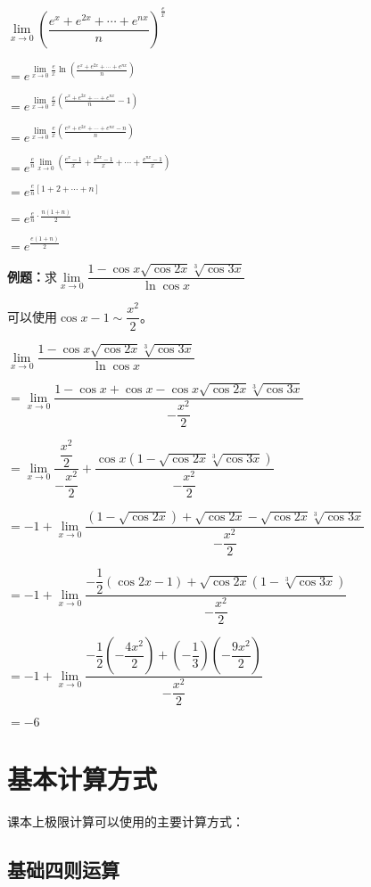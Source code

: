 \documentclass[UTF8, 12pt]{ctexart}
\begin{document}
$\lim\limits_{x\to 0}\left(\dfrac{e^x+e^{2x}+\cdots+e^{nx}}{n}\right)^{\frac{e}{x}}$

$=e^{\lim\limits_{x\to 0}\frac{e}{x}\ln\left(\frac{e^x+e^{2x}+\cdots+e^{nx}}{n}\right)}$

$=e^{\lim\limits_{x\to 0}\frac{e}{x}\left(\frac{e^x+e^{2x}+\cdots+e^{nx}}{n}-1\right)}$

$=e^{\lim\limits_{x\to 0}\frac{e}{x}\left(\frac{e^x+e^{2x}+\cdots+e^{nx}-n}{n}\right)}$

$=e^{\frac{e}{n}\lim\limits_{x\to 0}\left(\frac{e^x-1}{x}+\frac{e^{2x}-1}{x}+\cdots+\frac{e^{nx}-1}{x}\right)}$

$=e^{\frac{e}{n}[1+2+\cdots+n]}$

$=e^{\frac{e}{n}\cdot\frac{n(1+n)}{2}}$

$=e^{\frac{e(1+n)}{2}}$

\textbf{例题：}求$\lim\limits_{x\to 0}\dfrac{1-\cos x\sqrt{\cos 2x}\sqrt[3]{\cos 3x}}{\ln\cos x}$\medskip

可以使用$\cos x-1\sim\dfrac{x^2}{2}$。\medskip

$\lim\limits_{x\to 0}\dfrac{1-\cos x\sqrt{\cos 2x}\sqrt[3]{\cos 3x}}{\ln\cos x}$

$=\lim\limits_{x\to 0}\dfrac{1-\cos x+\cos x-\cos x\sqrt{\cos 2x}\sqrt[3]{\cos 3x}}{-\dfrac{x^2}{2}}$

$=\lim\limits_{x\to 0}\dfrac{\dfrac{x^2}{2}}{-\dfrac{x^2}{2}}+\dfrac{\cos x(1-\sqrt{\cos 2x}\sqrt[3]{\cos 3x})}{-\dfrac{x^2}{2}}$

$=-1+\lim\limits_{x\to 0}\dfrac{(1-\sqrt{\cos 2x})+\sqrt{\cos 2x}-\sqrt{\cos 2x}\sqrt[3]{\cos 3x}}{-\dfrac{x^2}{2}}$

$=-1+\lim\limits_{x\to 0}\dfrac{-\dfrac{1}{2}(\cos 2x-1)+\sqrt{\cos 2x}(1-\sqrt[3]{\cos 3x})}{-\dfrac{x^2}{2}}$

$=-1+\lim\limits_{x\to 0}\dfrac{-\dfrac{1}{2}(-\dfrac{4x^2}{2})+\left(-\dfrac{1}{3}\right)\left(-\dfrac{9x^2}{2}\right)}{-\dfrac{x^2}{2}}$

$=-6$

\section{基本计算方式}

课本上极限计算可以使用的主要计算方式：

\subsection{基础四则运算}
\end{document}
